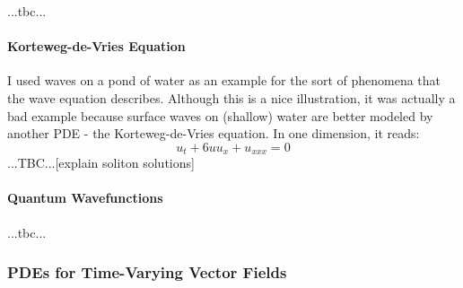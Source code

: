  ...tbc...



\paragraph{Korteweg-de-Vries Equation}
I used waves on a pond of water as an example for the sort of phenomena that the wave equation describes. Although this is a nice illustration, it was actually a bad example because surface waves on (shallow) water are better modeled by another PDE - the Korteweg-de-Vries equation. In one dimension, it reads:
\begin{equation}
 u_t + 6 u u_x + u_{xxx} = 0
\end{equation}
...TBC...[explain soliton solutions]




\paragraph{Quantum Wavefunctions} ...tbc...



% 





\subsubsection{PDEs for Time-Varying Vector Fields}

